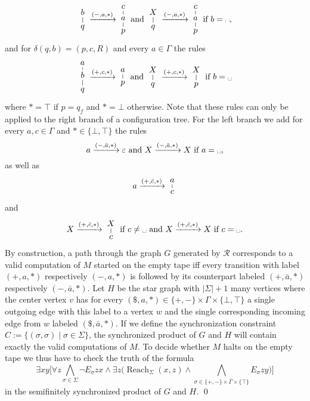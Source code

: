\documentclass{LMCS}
\renewcommand{\epsilon}{\varepsilon}
\DeclareMathOperator{\Reach}{Reach}
\begin{document}
\[\vcenter{\xymatrix@R=0.3pc@C=0.2pc{b \ar@{-}[d] \\ q}} \xrightarrow{(-,a,*)}
  \vcenter{\xymatrix@R=0.3pc@C=0.2pc{c \ar@{-}[d] \\ a \ar@{-}[d] \\ p}}
 \text{ and } 
 \vcenter{\xymatrix@R=0.3pc@C=0.2pc{X \ar@{-}[d] \\ q}} \xrightarrow{(-,a,*)} 
 \vcenter{ \xymatrix@R=0.3pc@C=0.2pc{c \ar@{-}[d] \\ a \ar@{-}[d] \\ p}}
 \text{ if } b= \mbox{\textvisiblespace},
\]
and for $\delta(q,b)=(p,c,R)$  and every $a \in \Gamma$ the rules
\[\vcenter{\xymatrix@R=0.3pc@C=0.2pc{a \ar@{-}[d] \\  b \ar@{-}[d] \\ q}} \xrightarrow{(+,c,*)}
  \vcenter{\xymatrix@R=0.3pc@C=0.2pc{a \ar@{-}[d] \\ p}}
 \text{ and } 
 \vcenter{\xymatrix@R=0.3pc@C=0.2pc{X \ar@{-}[d] \\ q}} \xrightarrow{(+,c,*)} 
 \vcenter{ \xymatrix@R=0.3pc@C=0.2pc{X \ar@{-}[d] \\ p}}
 \text{ if } b= \mbox{\textvisiblespace}
\]
where $*=\top$ if $p=q_f$ and $*=\bot$ otherwise. Note that these rules can only be applied to the
right branch of a configuration tree. For the left branch we add for every $a,c \in \Gamma$ and
$* \in \{\bot,\top\}$ the rules 
\[a \xrightarrow{(-,\bar a,*)} \epsilon \text{ and } X \xrightarrow{(-,\bar a,*)} X 
  \text{ if } a=\mbox{\textvisiblespace}, \]
as well as 
\[a \xrightarrow{(+,\bar c,*)}
  \vcenter{\xymatrix@R=0.3pc@C=0.2pc{a \ar@{-}[d] \\ c}} \]
and
\[ X  \xrightarrow{(+,\bar c,*)}  \vcenter{\xymatrix@R=0.3pc@C=0.2pc{X \ar@{-}[d] \\ c}} \text{ if } c \neq \mbox{\textvisiblespace} \text{ and } 
 X  \xrightarrow{(+,\bar c,*)} X \text{ if } c=\mbox{\textvisiblespace}.
\]
By construction, a path through the graph $G$ generated by $\mathcal R$ corresponds to a valid computation of $M$
started on the empty tape iff every transition with label $(+,a,*)$ respectively $(-,a,*)$ is followed by its 
counterpart labeled  $(+,\bar a,*)$ respectively $(-,\bar a, *)$. Let $H$ be the star graph with 
$|\Sigma|+1$ many vertices where the center vertex $v$ has  for every $(\$,a,*) \in \{+,-\} \times 
\Gamma \times\{\bot, \top\}$ a single outgoing edge with this label to a vertex $w$ and the single 
corresponding incoming edge from $w$ labeled $(\$,\bar a,*)$. 
If we define the synchronization constraint $C:=\{(\sigma, \sigma) \mid \sigma \in \Sigma\}$, the
synchronized product of $G$ and $H$ will contain exactly the valid computations of $M$. To decide
whether $M$ halts on the empty tape we thus have to check the truth of the formula 
\[
\exists xy \Big[\forall z \bigwedge_{\sigma \in \Sigma} \neg E_\sigma zx 
\wedge \exists z \Big(\Reach_\Sigma(x,z) \wedge \bigwedge_{\sigma \in \{+,-\} \times \bar \Gamma 
\times\{\top\}} E_\sigma zy\Big)\Big]
\]
in the semifinitely synchronized product of $G$ and $H$.
\qed
\end{document}
